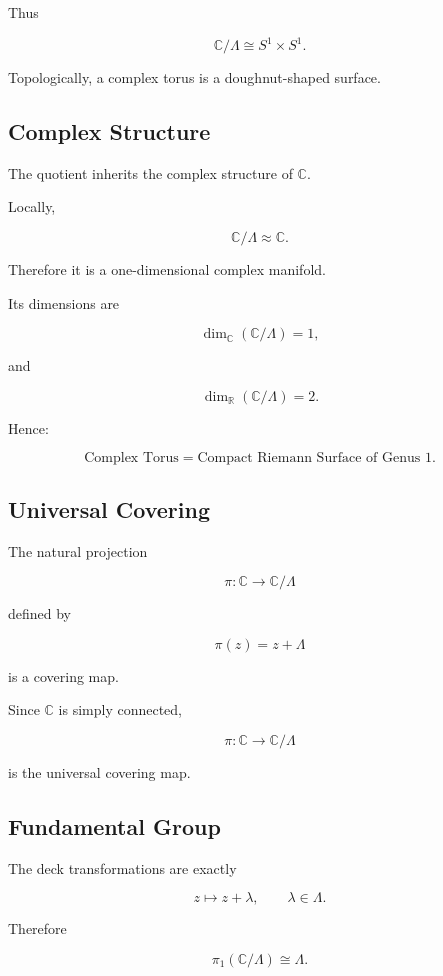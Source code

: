 \documentclass[12pt,a4paper]{article}
\theoremstyle{notespace}
\begin{document}
Thus

\[
\boxed{
	\mathbb C/\Lambda
	\cong
	S^1\times S^1.
}
\]

Topologically, a complex torus is a doughnut-shaped surface.

\subsection{Complex Structure}

The quotient inherits the complex structure of \(\mathbb C\).

Locally,

\[
\mathbb C/\Lambda
\approx
\mathbb C.
\]

Therefore it is a one-dimensional complex manifold.

Its dimensions are

\[
\dim_{\mathbb C}
(\mathbb C/\Lambda)
=
1,
\]

and

\[
\dim_{\mathbb R}
(\mathbb C/\Lambda)
=
2.
\]

Hence:

\[
\boxed{
	\text{Complex Torus}
	=
	\text{Compact Riemann Surface of Genus }1.
}
\]

\subsection{Universal Covering}

The natural projection

\[
\pi:\mathbb C\to\mathbb C/\Lambda
\]

defined by

\[
\pi(z)=z+\Lambda
\]

is a covering map.

Since \(\mathbb C\) is simply connected,

\[
\boxed{
	\pi:\mathbb C\to\mathbb C/\Lambda
}
\]

is the universal covering map.

\subsection{Fundamental Group}

The deck transformations are exactly

\[
z\mapsto z+\lambda,
\qquad
\lambda\in\Lambda.
\]

Therefore

\[
\pi_1(\mathbb C/\Lambda)
\cong
\Lambda.
\]
\end{document}
